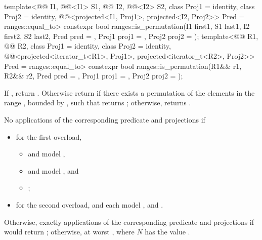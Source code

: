%
\begin{itemdecl}
template<@@ I1, @@<I1> S1, @@ I2,
         @@<I2> S2, class Proj1 = identity, class Proj2 = identity,
         @@<projected<I1, Proj1>,
                                       projected<I2, Proj2>> Pred = ranges::equal_to>
  constexpr bool ranges::is_permutation(I1 first1, S1 last1, I2 first2, S2 last2,
                                        Pred pred = {},
                                        Proj1 proj1 = {}, Proj2 proj2 = {});
template<@@ R1, @@ R2,
         class Proj1 = identity, class Proj2 = identity,
         @@<projected<iterator_t<R1>, Proj1>,
                                       projected<iterator_t<R2>, Proj2>> Pred = ranges::equal_to>
  constexpr bool ranges::is_permutation(R1&& r1, R2&& r2, Pred pred = {},
                                        Proj1 proj1 = {}, Proj2 proj2 = {});
\end{itemdecl}

\begin{itemdescr}
\pnum
\returns
If , return .
Otherwise return  if there exists a permutation of the elements
in the range , bounded by ,
such that
returns ;
otherwise, returns .

\pnum
\complexity
No applications of the corresponding predicate and projections if
\begin{itemize}
\item
for the first overload,
\begin{itemize}
\item {} and  model ,
\item {} and  model , and
\item {};
\end{itemize}
\item
for the second overload,
 and  each model , and
.
\end{itemize}
Otherwise, exactly  applications
of the corresponding predicate and projections
if 
would return ;
otherwise, at worst , where $N$ has the value .
\end{itemdescr}

